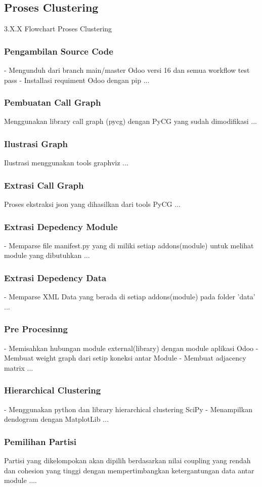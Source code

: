 \subsection{Proses Clustering}
3.X.X Flowchart Proses Clustering
\subsubsection{Pengambilan Source Code}
- Mengunduh dari branch main/master Odoo versi 16 dan semua  workflow test pass
- Installasi requiment Odoo dengan pip ...
\subsubsection{Pembuatan Call Graph}
Menggunakan library call graph (pycg) dengan PyCG yang sudah dimodifikasi ...
\subsubsection{Ilustrasi Graph}
Ilustrasi menggunakan tools graphviz ...
\subsubsection{Extrasi Call Graph}
Proses ekstraksi json yang dihasilkan dari tools PyCG ...
\subsubsection{Extrasi Depedency Module}
- Memparse file manifest.py yang di miliki setiap addons(module) untuk melihat module yang dibutuhkan ...
\subsubsection{Extrasi Depedency Data}
- Memparse XML Data yang berada di setiap addons(module) pada folder 'data' ...
\subsubsection{Pre Procesinng}
- Memisahkan hubungan module external(library) dengan module aplikasi Odoo
- Membuat weight graph dari setip koneksi antar Module
- Membuat adjacency matrix ...
\subsubsection{Hierarchical Clustering}
- Menggunakan python dan library hierarchical clustering SciPy
- Menampilkan dendogram dengan MatplotLib ...
\subsubsection{Pemilihan Partisi}
Partisi yang dikelompokan akan dipilih berdasarkan nilai coupling yang rendah dan cohesion yang tinggi dengan mempertimbangkan ketergantungan data antar module ....\\

